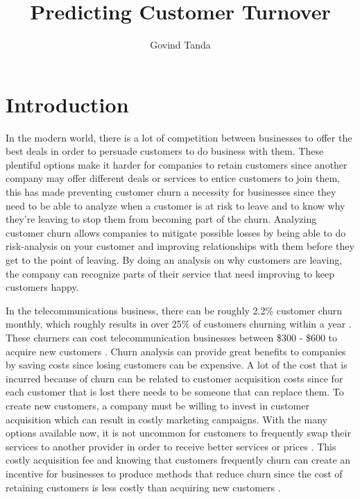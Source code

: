 \documentclass[12pt, a4paper]{article}
\title{Predicting Customer Turnover}
\author{Govind Tanda}
\begin{document}
\maketitle

\section{Introduction}

In the modern world, there is a lot of competition between businesses to offer the best deals in order to persuade customers to do business with them. These plentiful options make it harder for companies to retain customers since another company may offer different deals or services to entice customers to join them, this has made preventing customer churn a necessity for businesses since they need to be able to analyze when a customer is at risk to leave and to know why they're leaving to stop them from becoming part of the churn. Analyzing customer churn allows companies to mitigate possible losses by being able to do risk-analysis on your customer and improving relationships with them before they get to the point of leaving. By doing an analysis on why customers are leaving, the company can recognize parts of their service that need improving to keep customers happy.
 
In the telecommunications business, there can be roughly 2.2\% customer churn monthly, which roughly results in over 25\% of customers churning within a year \cite{10.5555/555454}. These churners can cost telecommunication businesses between \$300 - \$600 to acquire new customers \cite{WEI2002103}. Churn analysis can provide great benefits to companies by saving costs since losing customers can be expensive. A lot of the cost that is incurred because of churn can be related to customer acquisition costs since for each customer that is lost there needs to be someone that can replace them. To create new customers, a company must be willing to invest in customer acquisition which can result in costly marketing campaigns. With the many options available now, it is not uncommon for customers to frequently swap their services to another provider in order to receive better services or prices \cite{WEI2002103}.  This costly acquisition fee and knowing that customers frequently churn can create an incentive for businesses to produce methods that reduce churn since the cost of retaining customers is less costly than acquiring new customers \cite{WEI2002103}.
 
\end{document}
